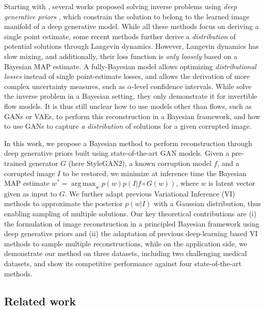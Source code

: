 \documentclass{article}
\DeclareMathOperator*{\argmax}{arg\,max}
\newcommand{\ci}[1]{\circ{#1}}
\begin{document}
Starting with \cite{bora2017compressed}, several works proposed solving inverse problems using \emph{deep generative priors} \cite{pan2020exploiting,asim2020invertible,hand2018phase,kelkar2021prior}, which constrain the solution to belong to the learned image manifold of a deep generative model. While all these methods focus on deriving a single point estimate, some recent methods further derive a \emph{distribution} of potential solutions \cite{jalal2021robust,jalal2021instance} through Langevin dynamics. However, Langevin dynamics has slow mixing, and additionally, their loss function is \emph{only loosely} based on a Bayesian MAP estimate. A fully-Bayesian model allows optimizing  \emph{distributional losses} instead of single point-estimate losses, and allows the derivation of more complex uncertainty measures, such as $\alpha$-level confidence intervals. While \cite{lugmayr2020srflow,whang2021composing} solve the inverse problem in a Bayesian setting, they only demonstrate it for invertible flow models. It is thus still unclear how to use models other than flows, such as GANs or VAEs, to perform this reconstruction in a Bayesian framework, and how to use GANs to capture \emph{a distribution} of solutions for a given corrupted image.

In this work, we propose a Bayesian method to perform reconstruction through deep generative priors built using state-of-the-art GAN models. Given a pre-trained generator $G$ (here StyleGAN2), a known corruption model $f$, and a corrupted image $I$ to be restored, we minimize at inference time the Bayesian MAP estimate $w^* = \argmax_w p(w)p(I|f \ci G(w))$, where $w$ is latent vector given as input to $G$. We further adapt previous Variational Inference (VI) methods \cite{kingma2013auto,blundell2015weight} to approximate the posterior $p(w|I)$ with a Gaussian distribution, thus enabling sampling of multiple solutions. Our key theoretical contributions are (i) the formulation of image reconstruction in a principled Bayesian framework using deep generative priors and (ii) the adaptation of previous deep-learning based VI methods to sample multiple reconstructions, while on the application side, we demonstrate our method on three datasets, including two challenging medical datasets, and show its competitive performance against four state-of-the-art methods.





\subsection{Related work}
 
\end{document}
